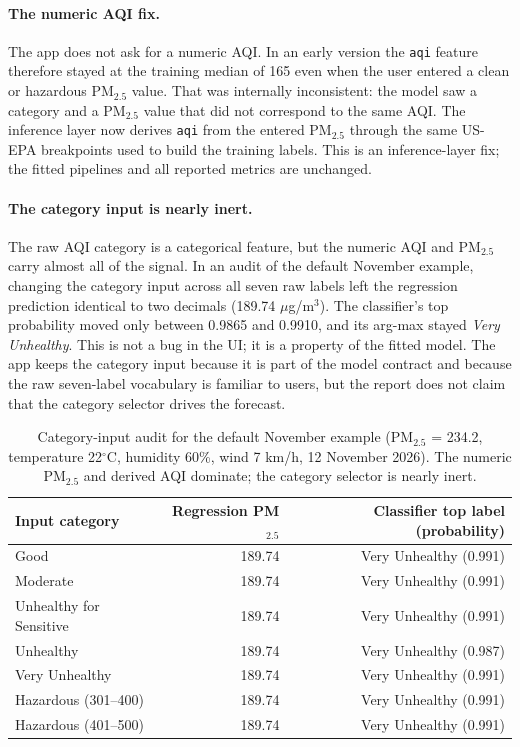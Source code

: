 \paragraph{The numeric AQI fix.} The app does not ask for a numeric AQI. In an
early version the \texttt{aqi} feature therefore stayed at the training median of
165 even when the user entered a clean or hazardous PM$_{2.5}$ value. That was
internally inconsistent: the model saw a category and a PM$_{2.5}$ value that did
not correspond to the same AQI. The inference layer now derives \texttt{aqi} from
the entered PM$_{2.5}$ through the same US-EPA breakpoints used to build the
training labels. This is an inference-layer fix; the fitted pipelines and all
reported metrics are unchanged.

\paragraph{The category input is nearly inert.} The raw AQI category is a
categorical feature, but the numeric AQI and PM$_{2.5}$ carry almost all of the
signal. In an audit of the default November example, changing the category input
across all seven raw labels left the regression prediction identical to two
decimals (189.74 $\mu$g/m$^3$). The classifier's top probability moved only
between 0.9865 and 0.9910, and its arg-max stayed \emph{Very Unhealthy}. This is
not a bug in the UI; it is a property of the fitted model. The app keeps the
category input because it is part of the model contract and because the raw
seven-label vocabulary is familiar to users, but the report does not claim that
the category selector drives the forecast.

\begin{table}[htbp]
\centering
\small
\begin{tabular}{@{}lrr@{}}
\toprule
\textbf{Input category} & \textbf{Regression PM$_{2.5}$} &
\textbf{Classifier top label (probability)} \\
\midrule
Good & 189.74 & Very Unhealthy (0.991) \\
Moderate & 189.74 & Very Unhealthy (0.991) \\
Unhealthy for Sensitive & 189.74 & Very Unhealthy (0.991) \\
Unhealthy & 189.74 & Very Unhealthy (0.987) \\
Very Unhealthy & 189.74 & Very Unhealthy (0.991) \\
Hazardous (301--400) & 189.74 & Very Unhealthy (0.991) \\
Hazardous (401--500) & 189.74 & Very Unhealthy (0.991) \\
\bottomrule
\end{tabular}
\caption{Category-input audit for the default November example (PM$_{2.5}$ =
234.2, temperature 22$^\circ$C, humidity 60\%, wind 7 km/h, 12 November 2026).
The numeric PM$_{2.5}$ and derived AQI dominate; the category selector is nearly
inert.}
\label{tab:category-audit}
\end{table}

